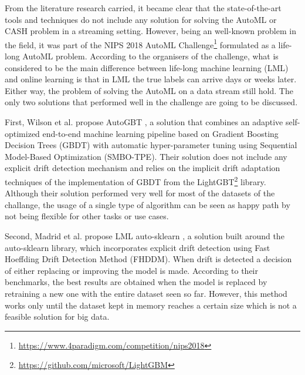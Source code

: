 \documentclass{sig-alternate-br}
\begin{document}
From the literature research carried, it became clear that the state-of-the-art tools and techniques do not include any solution for solving the AutoML or CASH problem in a streaming setting. However, being an well-known problem in the field, it was part of the NIPS 2018 AutoML Challenge\footnote{\url{https://www.4paradigm.com/competition/nips2018}} formulated as a life-long AutoML problem. According to the organisers of the challenge, what is considered to be the main difference between life-long machine learning (LML) and online learning is that in LML the true labels can arrive days or weeks later. Either way, the problem of solving the AutoML on a data stream still hold. The only two solutions that performed well in the challenge are going to be discussed. 

First, Wilson et al. propose AutoGBT \cite{wilson2020automatically}, a solution that combines an adaptive self-optimized end-to-end machine learning pipeline based on Gradient Boosting Decision Trees (GBDT) with automatic hyper-parameter tuning using Sequential Model-Based Optimization (SMBO-TPE). Their solution does not include any explicit drift detection mechanism and relies on the implicit drift adaptation techniques of the implementation of GBDT from the LightGBT\footnote{\url{https://github.com/microsoft/LightGBM}} library. Although their solution performed very well for most of the datasets of the challange, the usage of a single type of algorithm can be seen as happy path by not being flexible for other tasks or use cases.

Second, Madrid et al. propose LML auto-sklearn \cite{madrid2019towards}, a solution built around the auto-sklearn library, which incorporates explicit drift detection using Fast Hoeffding Drift Detection Method (FHDDM). When drift is detected a decision of either replacing or improving the model is made. According to their benchmarks, the best results are obtained when the model is replaced by retraining a new one with the entire dataset seen so far. However, this method works only until the dataset kept in memory reaches a certain size which is not a feasible solution for big data.
\end{document}
